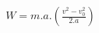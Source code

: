 \documentclass[preview]{standalone}
\begin{document}
\begin{align*}
W = m.a . \left(\frac{v^2 - v^{2}_0}{2.a}\right)
\end{align*}
\end{document}
